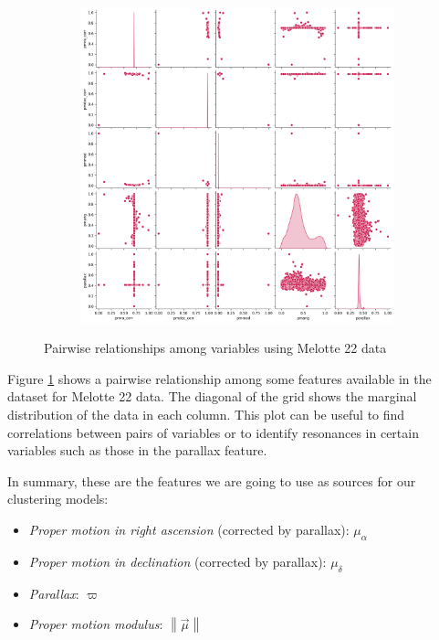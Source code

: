 \documentclass[11pt, a4paper, english]{book}
\begin{document}
\begin{figure}[htbp]
  \centering
  \begin{subfigure}{\textwidth}
    \centering
    \includegraphics[width=\textwidth]{../figures/melotte_22/features_melotte_22.png}
  \end{subfigure}
  \caption{Pairwise relationships among variables using Melotte 22 data}
  \label{fig:features_melotte_22}
\end{figure}

\newpage

Figure \ref{fig:features_melotte_22} shows a pairwise relationship among some features available
in the dataset for Melotte 22 data.
The diagonal of the grid shows the marginal distribution of the data in each column.
This plot can be useful to find correlations between pairs of variables or
to identify resonances in certain variables such as those in the parallax feature.

In summary, these are the features we are going to use as sources for our clustering models:

\begin{itemize}
  \item \emph{Proper motion in right ascension} (corrected by parallax): $\mu_{\alpha}$
  \item \emph{Proper motion in declination} (corrected by parallax): $\mu_{\delta}$
  \item \emph{Parallax}: $\varpi$
  \item \emph{Proper motion modulus}: $\left\| \vec{\mu} \right\|$
\end{itemize}
\end{document}
